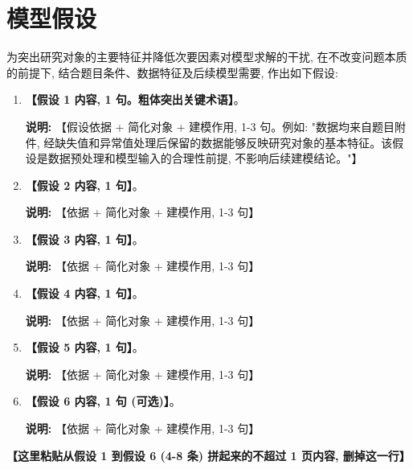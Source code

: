 
\section{模型假设}

为突出研究对象的主要特征并降低次要因素对模型求解的干扰, 在不改变问题本质的前提下, 结合题目条件、数据特征及后续模型需要, 作出如下假设:

\begin{enumerate}[label=(\arabic*)]

\item \textbf{【假设 1 内容, 1 句。\textbf{粗体}突出关键术语】}。

\textbf{说明:} 【假设依据 + 简化对象 + 建模作用, 1-3 句。例如: "数据均来自题目附件, 经缺失值和异常值处理后保留的数据能够反映研究对象的基本特征。该假设是数据预处理和模型输入的合理性前提, 不影响后续建模结论。"】

\item \textbf{【假设 2 内容, 1 句】}。

\textbf{说明:} 【依据 + 简化对象 + 建模作用, 1-3 句】

\item \textbf{【假设 3 内容, 1 句】}。

\textbf{说明:} 【依据 + 简化对象 + 建模作用, 1-3 句】

\item \textbf{【假设 4 内容, 1 句】}。

\textbf{说明:} 【依据 + 简化对象 + 建模作用, 1-3 句】

\item \textbf{【假设 5 内容, 1 句】}。

\textbf{说明:} 【依据 + 简化对象 + 建模作用, 1-3 句】

\item \textbf{【假设 6 内容, 1 句 (可选)】}。

\textbf{说明:} 【依据 + 简化对象 + 建模作用, 1-3 句】

\end{enumerate}


\textbf{【这里粘贴从假设 1 到假设 6 (4-8 条) 拼起来的不超过 1 页内容, 删掉这一行】}
